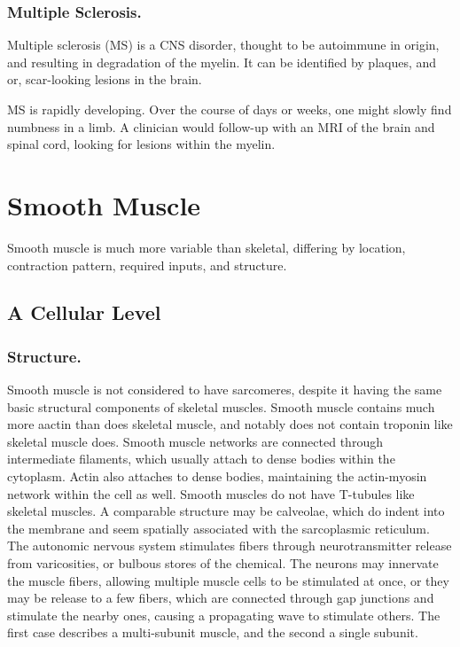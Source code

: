 \documentclass[12pt]{report}
\begin{document}
\subsubsection{Multiple Sclerosis.}

Multiple sclerosis (MS) is a CNS disorder, thought to be autoimmune in origin, and resulting in degradation of the myelin. It can be identified by plaques, and or, scar-looking lesions in the brain.\newline

MS is rapidly developing. Over the course of days or weeks, one might slowly find numbness in a limb. A clinician would follow-up with an MRI of the brain and spinal cord, looking for lesions within the myelin. 


\section{Smooth Muscle}

Smooth muscle is much more variable than skeletal, differing by location, contraction pattern, required inputs, and structure. 


\subsection{A Cellular Level}
\subsubsection{Structure.}
Smooth muscle is not considered to have sarcomeres, despite it having the same basic structural components of skeletal muscles. Smooth muscle contains much more aactin than does skeletal muscle, and notably does not contain troponin like skeletal muscle does. Smooth muscle networks are connected through intermediate filaments, which usually attach to dense bodies within the cytoplasm. Actin also attaches to dense bodies, maintaining the actin-myosin network within the cell as well. Smooth muscles do not have T-tubules like skeletal muscles. A comparable structure may be calveolae, which do indent into the membrane and seem spatially associated with the sarcoplasmic reticulum. The autonomic nervous system stimulates fibers through neurotransmitter release from varicosities, or bulbous stores of the chemical. The neurons may innervate the muscle fibers, allowing multiple muscle cells to be stimulated at once, or they may be release to a few fibers, which are connected through gap junctions and stimulate the nearby ones, causing a propagating wave to stimulate others. The first case describes a multi-subunit muscle, and the second a single subunit. 
\end{document}
